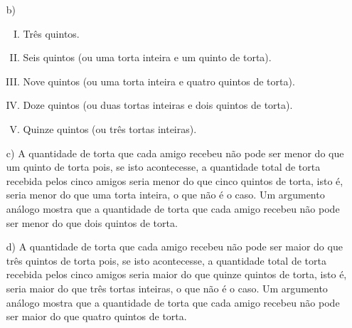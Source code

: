 \begin{multicols}{2}
\begin{solucao}{}{}
\begin{enumerate} [\quad a)]

    \item[b)]
\begin{enumerate}[I)]
          \item Três quintos.
          \item Seis quintos (ou uma torta inteira e um quinto de torta).
          \item Nove quintos (ou uma torta inteira e quatro quintos de torta).
          \item Doze quintos (ou duas tortas inteiras e dois quintos de torta).
          \item Quinze quintos (ou três tortas inteiras).
\end{enumerate}

    \item[c)]     A quantidade de torta que cada amigo recebeu não pode ser menor do que um quinto de torta pois, se isto acontecesse, a quantidade total de torta recebida pelos cinco amigos seria menor do que cinco quintos de torta, isto é, seria menor do que uma torta inteira, o que não é o caso. Um argumento análogo mostra que a quantidade de torta que cada amigo recebeu não pode ser menor do que dois quintos de torta.
    \item[d)]       A quantidade de torta que cada amigo recebeu não pode ser maior do que três quintos de torta pois, se isto acontecesse, a quantidade total de torta recebida pelos cinco amigos seria maior do que quinze quintos de torta, isto é, seria maior do que três tortas inteiras, o que não é o caso. Um argumento análogo mostra que a quantidade de torta que cada amigo recebeu não pode ser maior do que quatro quintos de torta.
\end{enumerate} %


\end{solucao}




\end{multicols}
